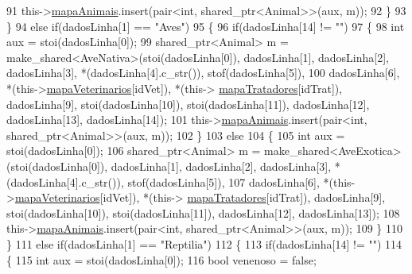 \begin{DoxyCode}
91                     this->\hyperlink{classPetFera_ab0ba5fe6332bcffdabb7b03001280697}{mapaAnimais}.insert(pair<\textcolor{keywordtype}{int}, shared\_ptr<Animal>>(aux, m));
92                 \}
93             \}
94             \textcolor{keywordflow}{else} \textcolor{keywordflow}{if}(dadosLinha[1] == \textcolor{stringliteral}{"Aves"})
95             \{
96                 \textcolor{keywordflow}{if}(dadosLinha[14] != \textcolor{stringliteral}{""})
97                 \{
98                     \textcolor{keywordtype}{int} aux = stoi(dadosLinha[0]);
99                     shared\_ptr<Animal> m = make\_shared<AveNativa>(stoi(dadosLinha[0]), dadosLinha[1], 
      dadosLinha[2], dadosLinha[3], *(dadosLinha[4].c\_str()), stof(dadosLinha[5]),
100                     dadosLinha[6], *(this->\hyperlink{classPetFera_a2bed2112a627bbdb3c0338654330a1ab}{mapaVeterinarios}[idVet]), *(this->
      \hyperlink{classPetFera_ac85920fc6c1471743838e6fe4444304d}{mapaTratadores}[idTrat]), dadosLinha[9], stoi(dadosLinha[10]), stoi(dadosLinha[11]), 
      dadosLinha[12], dadosLinha[13], dadosLinha[14]);
101                     this->\hyperlink{classPetFera_ab0ba5fe6332bcffdabb7b03001280697}{mapaAnimais}.insert(pair<\textcolor{keywordtype}{int}, shared\_ptr<Animal>>(aux, m));
102                 \}
103                 \textcolor{keywordflow}{else}
104                 \{
105                     \textcolor{keywordtype}{int} aux = stoi(dadosLinha[0]);
106                     shared\_ptr<Animal> m = make\_shared<AveExotica>(stoi(dadosLinha[0]), dadosLinha[1], 
      dadosLinha[2], dadosLinha[3], *(dadosLinha[4].c\_str()), stof(dadosLinha[5]),
107                     dadosLinha[6], *(this->\hyperlink{classPetFera_a2bed2112a627bbdb3c0338654330a1ab}{mapaVeterinarios}[idVet]), *(this->
      \hyperlink{classPetFera_ac85920fc6c1471743838e6fe4444304d}{mapaTratadores}[idTrat]), dadosLinha[9], stoi(dadosLinha[10]), stoi(dadosLinha[11]), 
      dadosLinha[12], dadosLinha[13]);
108                     this->\hyperlink{classPetFera_ab0ba5fe6332bcffdabb7b03001280697}{mapaAnimais}.insert(pair<\textcolor{keywordtype}{int}, shared\_ptr<Animal>>(aux, m));
109                 \}
110             \}
111             \textcolor{keywordflow}{else} \textcolor{keywordflow}{if}(dadosLinha[1] == \textcolor{stringliteral}{"Reptilia"})
112             \{
113                 \textcolor{keywordflow}{if}(dadosLinha[14] != \textcolor{stringliteral}{""})
114                 \{
115                     \textcolor{keywordtype}{int} aux = stoi(dadosLinha[0]);
116                     \textcolor{keywordtype}{bool} venenoso = \textcolor{keyword}{false};

\end{DoxyCode}
